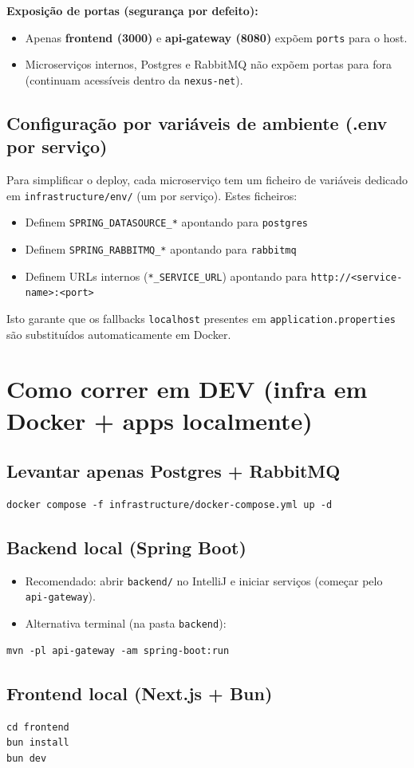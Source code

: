 \textbf{Exposição de portas (segurança por defeito):}
\begin{itemize}[nosep]
  \item Apenas \textbf{frontend (3000)} e \textbf{api-gateway (8080)} expõem \texttt{ports} para o host.
  \item Microserviços internos, Postgres e RabbitMQ não expõem portas para fora (continuam acessíveis dentro da \texttt{nexus-net}).
\end{itemize}

\subsection{Configuração por variáveis de ambiente (.env por serviço)}
Para simplificar o deploy, cada microserviço tem um ficheiro de variáveis dedicado em \texttt{infrastructure/env/} (um por serviço). Estes ficheiros:
\begin{itemize}[nosep]
  \item Definem \texttt{SPRING\_DATASOURCE\_*} apontando para \texttt{postgres}
  \item Definem \texttt{SPRING\_RABBITMQ\_*} apontando para \texttt{rabbitmq}
  \item Definem URLs internos (\texttt{*\_SERVICE\_URL}) apontando para \texttt{http://<service-name>:<port>}
\end{itemize}

Isto garante que os fallbacks \texttt{localhost} presentes em \texttt{application.properties} são substituídos automaticamente em Docker.

\section{Como correr em DEV (infra em Docker + apps localmente)}
\subsection{Levantar apenas Postgres + RabbitMQ}
\begin{verbatim}
docker compose -f infrastructure/docker-compose.yml up -d
\end{verbatim}

\subsection{Backend local (Spring Boot)}
\begin{itemize}[nosep]
  \item Recomendado: abrir \texttt{backend/} no IntelliJ e iniciar serviços (começar pelo \texttt{api-gateway}).
  \item Alternativa terminal (na pasta \texttt{backend}):
\end{itemize}
\begin{verbatim}
mvn -pl api-gateway -am spring-boot:run
\end{verbatim}

\subsection{Frontend local (Next.js + Bun)}
\begin{verbatim}
cd frontend
bun install
bun dev
\end{verbatim}